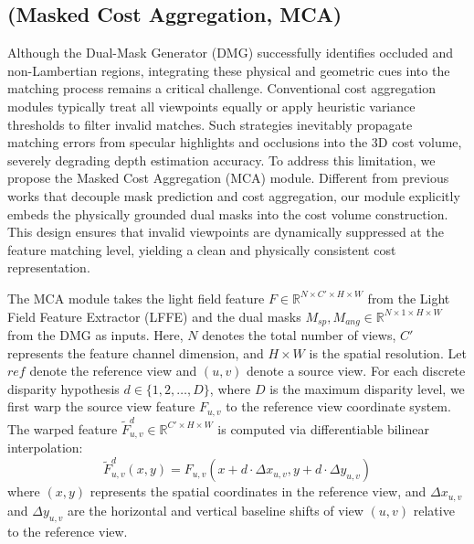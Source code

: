\subsection{(Masked Cost Aggregation, MCA)}

Although the Dual-Mask Generator (DMG) successfully identifies occluded and non-Lambertian regions, integrating these physical and geometric cues into the matching process remains a critical challenge. Conventional cost aggregation modules typically treat all viewpoints equally or apply heuristic variance thresholds to filter invalid matches. Such strategies inevitably propagate matching errors from specular highlights and occlusions into the 3D cost volume, severely degrading depth estimation accuracy. To address this limitation, we propose the Masked Cost Aggregation (MCA) module. Different from previous works that decouple mask prediction and cost aggregation, our module explicitly embeds the physically grounded dual masks into the cost volume construction. This design ensures that invalid viewpoints are dynamically suppressed at the feature matching level, yielding a clean and physically consistent cost representation.

The MCA module takes the light field feature $F \in \mathbb{R}^{N \times C' \times H \times W}$ from the Light Field Feature Extractor (LFFE) and the dual masks $M_{sp}, M_{ang} \in \mathbb{R}^{N \times 1 \times H \times W}$ from the DMG as inputs. Here, $N$ denotes the total number of views, $C'$ represents the feature channel dimension, and $H \times W$ is the spatial resolution. Let $ref$ denote the reference view and $(u,v)$ denote a source view. For each discrete disparity hypothesis $d \in \{1, 2, \dots, D\}$, where $D$ is the maximum disparity level, we first warp the source view feature $F_{u,v}$ to the reference view coordinate system. The warped feature $\tilde{F}_{u,v}^d \in \mathbb{R}^{C' \times H \times W}$ is computed via differentiable bilinear interpolation:
\begin{equation}
\label{eq:eq34}
\tilde{F}_{u,v}^d(x,y) = F_{u,v}(x + d \cdot \Delta x_{u,v}, y + d \cdot \Delta y_{u,v})
\end{equation}
where $(x,y)$ represents the spatial coordinates in the reference view, and $\Delta x_{u,v}$ and $\Delta y_{u,v}$ are the horizontal and vertical baseline shifts of view $(u,v)$ relative to the reference view.

